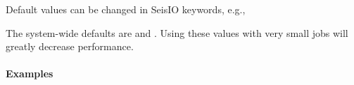 \documentclass[letterpaper,11pt,english]{sphinxmanual}
\begin{document}
Default values can be changed in SeisIO keywords, e.g.,

%
\begin{sphinxVerbatim}[commandchars=\\\{\}]
  
  
\end{sphinxVerbatim}

The system-wide defaults are  and . Using these
values with very small jobs will greatly decrease performance.


\paragraph{Examples}
\end{document}
